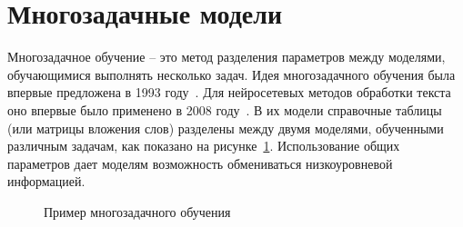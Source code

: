 \section{Многозадачные модели}\label{ch:mtl} 

Многозадачное обучение -- это метод разделения параметров между моделями, обучающимися выполнять несколько задач. Идея многозадачного обучения была впервые предложена в 1993 году~\cite{caruana_1997}. Для нейросетевых методов обработки текста оно впервые было применено в 2008 году~\cite{collobert_2008}. В их модели справочные таблицы (или матрицы вложения слов) разделены между двумя моделями, обученными различным задачам, как показано на рисунке~\ref{fig:MTL1}.
Использование общих параметров дает моделям возможность обмениваться низкоуровневой информацией.


\begin{figure}[ht]
 \caption{Пример многозадачного обучения}\label{fig:MTL1}
\end{figure}

